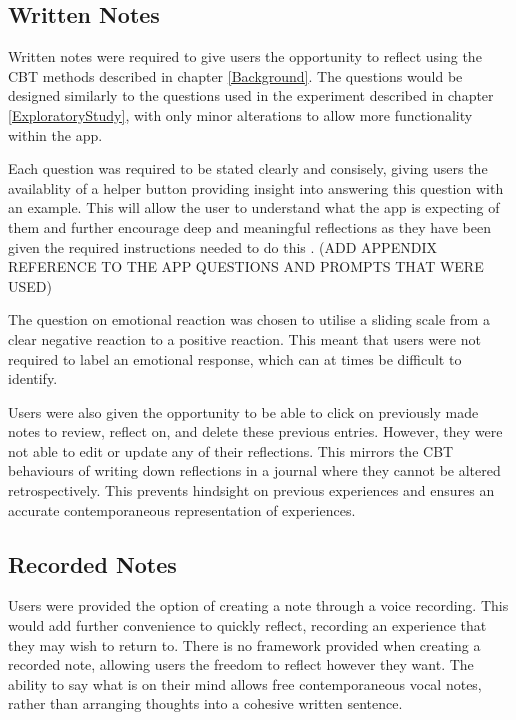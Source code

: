 \documentclass{l4proj}
\begin{document}
\subsection{Written Notes}

Written notes were required to give users the opportunity to reflect using the CBT methods described in chapter \ref{Background}. The questions would be designed similarly to the questions used in the experiment described in chapter \ref{ExploratoryStudy}, with only minor alterations to allow more functionality within the app. 

Each question was required to be stated clearly and consisely, giving users the availablity of a helper button providing insight into answering this question with an example. This will allow the user to understand what the app is expecting of them and further encourage deep and meaningful reflections as they have been given the required instructions needed to do this \citep{bruno_reflective_2018}. (ADD APPENDIX REFERENCE TO THE APP QUESTIONS AND PROMPTS THAT WERE USED)

The question on emotional reaction was chosen to utilise a sliding scale from a clear negative reaction to a positive reaction. This meant that users were not required to label an emotional response, which can at times be difficult to identify. 

Users were also given the opportunity to be able to click on previously made notes to review, reflect on, and delete these previous entries. However, they were not able to edit or update any of their reflections. This mirrors the CBT behaviours of writing down reflections in a journal where they cannot be altered retrospectively. This prevents hindsight on previous experiences and ensures an accurate contemporaneous representation of experiences. 

\subsection{Recorded Notes}

Users were provided the option of creating a note through a voice recording. This would add further convenience to quickly reflect, recording an experience that they may wish to return to. There is no framework provided when creating a recorded note, allowing users the freedom to reflect however they want. The ability to say what is on their mind allows free contemporaneous vocal notes, rather than arranging thoughts into a cohesive written sentence.
\end{document}
